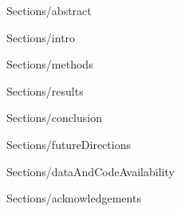 \documentclass[letterpaper]{article}
\begin{document}
\maketitle

{Sections/abstract}

{Sections/intro}

{Sections/methods}

{Sections/results}

{Sections/conclusion}

{Sections/futureDirections}

{Sections/dataAndCodeAvailability}

{Sections/acknowledgements}

\footnotesize



\end{document}
